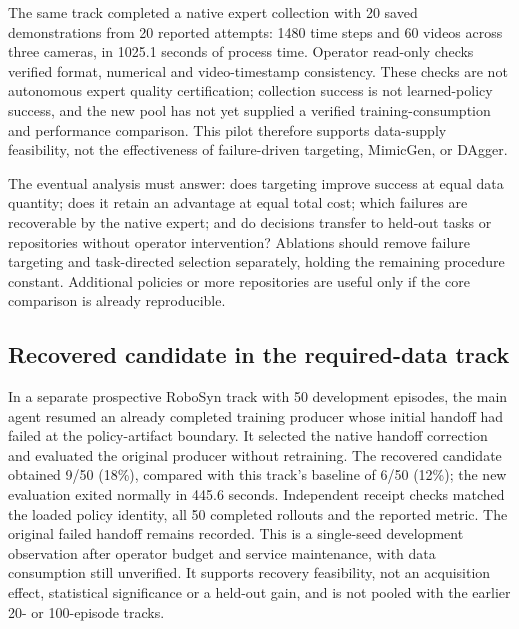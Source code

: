 \documentclass[10pt,twocolumn,letterpaper]{article}
\begin{document}
The same track completed a native expert collection with 20 saved demonstrations
from 20 reported attempts: 1480 time steps and 60 videos across three cameras,
in 1025.1 seconds of process time. Operator read-only checks verified format,
numerical and video-timestamp consistency. These checks are not autonomous expert
quality certification; collection success is not learned-policy success, and the
new pool has not yet supplied a verified training-consumption and performance
comparison. This pilot therefore supports data-supply feasibility, not the
effectiveness of failure-driven targeting, MimicGen, or DAgger.

The eventual analysis must answer: does targeting improve success at equal data
quantity; does it retain an advantage at equal total cost; which failures are
recoverable by the native expert; and do decisions transfer to held-out tasks or
repositories without operator intervention? Ablations should remove failure
targeting and task-directed selection separately, holding the remaining procedure
constant. Additional policies or more repositories are useful only if the core
comparison is already reproducible.

\subsection{Recovered candidate in the required-data track}
In a separate prospective RoboSyn track with 50 development episodes, the main
agent resumed an already completed training producer whose initial handoff had
failed at the policy-artifact boundary. It selected the native handoff correction
and evaluated the original producer without retraining. The recovered candidate
obtained 9/50 (18\%), compared with this track's baseline of 6/50 (12\%); the new
evaluation exited normally in 445.6 seconds. Independent receipt checks matched
the loaded policy identity, all 50 completed rollouts and the reported metric.
The original failed handoff remains recorded.
This is a single-seed development observation after operator budget and service
maintenance, with data consumption still unverified. It supports recovery
feasibility, not an acquisition effect, statistical significance or a held-out
gain, and is not pooled with the earlier 20- or 100-episode tracks.
\end{document}
